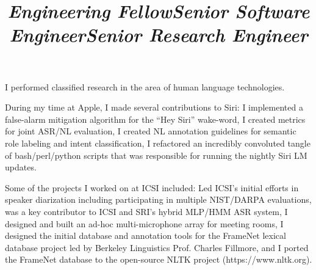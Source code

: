 \documentclass[11pt]{res} %
\newenvironment{indentedblock*}[1][\parindent]
  {%
    \par
    \medskip
    \leftskip#1\relax
  }
  {%
    \par
    \medskip
  }
\begin{document}
\begin{resume}
\begin{position}
\begin{indentedblock*}[.1in]
\end{indentedblock*}

\end{position}


\title{{\sl Engineering Fellow}}
\begin{position}

\vspace{-.4in}
\begin{indentedblock*}[.1in]

I performed classified research in the area of human language technologies.

\end{indentedblock*}

\end{position}


\pagebreak[3]

\title{{\sl Senior Software Engineer}}
\begin{position}

\vspace{-.4in}
\begin{indentedblock*}[.1in]

During my time at Apple, I made several contributions to Siri: I implemented a false-alarm mitigation algorithm for the “Hey Siri” wake-word, I created metrics for joint ASR/NL evaluation, I created NL annotation guidelines for semantic role labeling and intent classification, I refactored an incredibly convoluted tangle of bash/perl/python scripts that was responsible for running the nightly Siri LM updates.

\end{indentedblock*}

\end{position}


\pagebreak[3]

\title{{\sl Senior Research Engineer}}
\begin{position}

\vspace{-.4in}
\begin{indentedblock*}[.1in]

Some of the projects I worked on at ICSI included: Led ICSI's initial efforts in speaker diarization including participating in multiple NIST/DARPA evaluations, was a key contributor to ICSI and SRI's hybrid MLP/HMM ASR system, I designed and built an ad-hoc multi-microphone array for meeting rooms, I designed the initial database and annotation tools for the FrameNet lexical database project led by Berkeley Linguistics Prof. Charles Fillmore, and I ported the FrameNet database to the open-source NLTK project (https://www.nltk.org).


\end{indentedblock*}
\end{position}
\end{resume}
\end{document}
